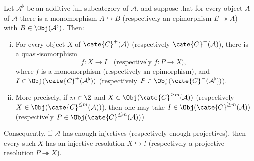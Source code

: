 \begin{theorem}\label{prop:resolution-existence}
	Let $\mathcal{A}^\flat$ be an additive full subcategory of $\mathcal{A}$,
	and suppose that for every object $A$ of $\mathcal{A}$ there is a
	monomorphism $A\hookrightarrow B$ (respectively an epimorphism
	$B\twoheadrightarrow A$) with $B\in\Obj(\mathcal{A}^\flat)$. Then:
	\begin{enumerate}[(i)]
		\item For every object $X$ of $\cate{C}^+(\mathcal{A})$ (respectively
		$\cate{C}^-(\mathcal{A})$), there is a quasi-isomorphism
		\[ f: X \to I \quad \text{(respectively $f: P \to X$)}, \]
		where $f$ is a monomorphism (respectively an epimorphism), and
		$I\in\Obj(\cate{C}^+(\mathcal{A}^\flat))$ (respectively
		$P\in\Obj(\cate{C}^-(\mathcal{A}^\flat))$).
		\item More precisely, if $m\in\Z$ and
		$X\in\Obj(\cate{C}^{\geq m}(\mathcal{A}))$ (respectively
		$X\in\Obj(\cate{C}^{\leq m}(\mathcal{A}))$), then one may take
		$I\in\Obj(\cate{C}^{\geq m}(\mathcal{A}))$ (respectively
		$P\in\Obj(\cate{C}^{\leq m}(\mathcal{A}))$).
	\end{enumerate}

	Consequently, if $\mathcal{A}$ has enough injectives (respectively enough
	projectives), then every such $X$ has an injective resolution
	$X\hookrightarrow I$ (respectively a projective resolution
	$P\twoheadrightarrow X$).
\end{theorem}
